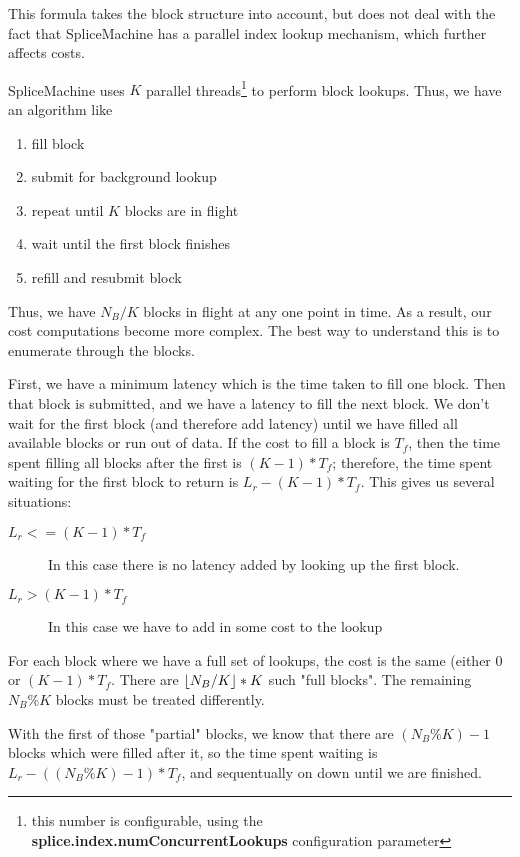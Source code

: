 \documentclass[10pt]{amsart}
\DeclarePairedDelimiter{\floor}{\lfloor}{\rfloor}
\begin{document}
This formula takes the block structure into account, but does not deal with the fact that SpliceMachine has a parallel index lookup mechanism, which further affects costs. 

SpliceMachine uses $K$ parallel threads\footnote{this number is configurable, using the \textbf{splice.index.numConcurrentLookups} configuration parameter} to perform block lookups. Thus, we have an algorithm like

\begin{enumerate}
				\item fill block
				\item submit for background lookup
				\item repeat until $K$ blocks are in flight
				\item  wait until the first block finishes
				\item refill and resubmit block
\end{enumerate}

Thus, we have $N_B/K$ blocks in flight at any one point in time. As a result, our cost computations become more complex. The best way to understand this is to enumerate through the blocks.

First, we have a minimum latency which is the time taken to fill one block. Then that block is submitted, and we have a latency to fill the next block. We don't wait for the first block (and therefore add latency) until we have filled all available blocks or run out of data. If the cost to fill a block is $T_f$, then the time spent filling all blocks after the first is $(K-1)*T_f$; therefore, the time spent waiting for the first block to return is $L_r - (K-1)*T_f$. This gives us several situations:

\begin{description}
				\item[$L_r <= (K-1)*T_f$] In this case there is no latency added by looking up the first block.
				\item[$L_r >(K-1)*T_f$] In this case we have to add in some cost to the lookup
\end{description}

For each block where we have a full set of lookups, the cost is the same (either 0 or $(K-1)*T_f$. There are $\floor{N_B/K}*K$ such "full blocks". The remaining $N_B \% K$ blocks must be treated differently.

With the first of those "partial" blocks, we know that there are $(N_B \% K) -1$ blocks which were filled after it, so the time spent waiting is $L_r - ((N_B \% K) -1)*T_f$, and sequentually on down until we are finished.
\end{document}
